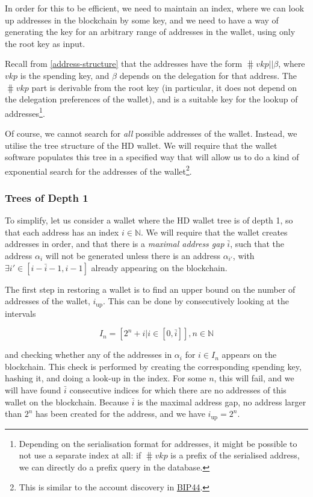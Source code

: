 \documentclass[11pt,a4paper]{article}
\begin{document}
In order for this to be efficient, we need to maintain an index, where
we can look up addresses in the blockchain by some key, and we need to
have a way of generating the key for an arbitrary range of addresses in
the wallet, using only the root key as input.

Recall from \cref{address-structure} that the addresses have the form
\(\hash{vkp} \mathbin{||} \beta\), where \(vkp\) is the spending key, and
\(\beta\) depends on the delegation for that address. The
\(\hash{vkp}\) part is derivable from the root key (in
particular, it does not depend on the delegation preferences of the
wallet), and is a suitable key for the lookup of addresses\footnote{Depending
  on the serialisation format for addresses, it might be possible to not
  use a separate index at all: if \(\hash{vkp}\) is a prefix of
  the serialised address, we can directly do a prefix query in the
  database.}.

Of course, we cannot search for \emph{all} possible addresses of the
wallet. Instead, we utilise the tree structure of the HD wallet. We will
require that the wallet software populates this tree in a specified way
that will allow us to do a kind of exponential search for the addresses
of the wallet\footnote{This is similar to the account discovery
  in \href{https://github.com/bitcoin/bips/blob/master/bip-0044.mediawiki}{BIP44}.}.

\subsubsection{Trees of Depth 1}
\label{trees-of-depth-1}

To simplify, let us consider a wallet where the HD wallet tree is of
depth 1, so that each address has an index \(i \in \mathbb{N}\). We will
require that the wallet creates addresses in order, and that there is a
\emph{maximal address gap} \(\bar{i}\), such that the address
\(\alpha_i\) will not be generated unless there is an address
\(\alpha_{i'}\), with \(\exists i' \in [i-\bar{i}-1, i-1]\) already
appearing on the blockchain.

The first step in restoring a wallet is to find an upper bound on the
number of addresses of the wallet, \(i_{\text{up}}\). This can be done
by consecutively looking at the intervals

\[
I_{n} = [2^n + i | i \in [0, \bar{i}]], n \in \mathbb{N}
\]

and checking whether any of the addresses in \(\alpha_i\) for
\(i \in I_{n}\) appears on the blockchain. This check is performed by
creating the corresponding spending key, hashing it, and doing a look-up
in the index. For some \(n\), this will fail, and we will have found
\(\bar{i}\) consecutive indices for which there are no addresses of this
wallet on the blockchain. Because \(\bar{i}\) is the maximal address
gap, no address larger than \(2^n\) has been created for the address,
and we have \(i_\text{up} = 2^n\).
\end{document}
